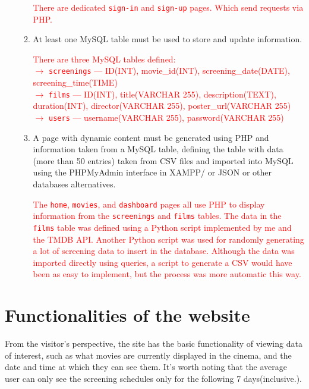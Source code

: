 \documentclass[a4paper]{article}
\begin{document}
\begin{enumerate}
\begin{enumerate}[label={$-$}]
            \textcolor{red}{There are dedicated \texttt{sign-in} and \texttt{sign-up}  pages. Which send requests via PHP.}
            \item At least one MySQL table must be used to store and update information.

            \textcolor{red}{There are three MySQL tables defined:\\$\rightarrow$ \texttt{screenings} --- ID(INT), movie\_id(INT), screening\_date(DATE), screening\_time(TIME)\\$\rightarrow$ \texttt{films} --- ID(INT), title(VARCHAR 255), description(TEXT), duration(INT), director(VARCHAR 255), poster\_url(VARCHAR 255)\\$\rightarrow$ \texttt{users} --- username(VARCHAR 255), password(VARCHAR 255)}
            \item A page with dynamic content must be generated using PHP and information taken from a MySQL table, defining the table with data (more than 50 entries) taken from CSV files and imported into MySQL using the PHPMyAdmin interface in XAMPP/ or JSON or other databases alternatives.

            \textcolor{red}{The \texttt{home}, \texttt{movies}, and \texttt{dashboard} pages all use PHP to display information from the \texttt{screenings} and \texttt{films} tables. The data in the \texttt{films} table was defined using a Python script implemented by me and the TMDB API. Another Python script was used for randomly generating a lot of screening data to insert in the database. Although the data was imported directly using queries, a script to generate a CSV would have been as easy to implement, but the process was more automatic this way.}
            \end{enumerate}
    \end{enumerate}

\section{Functionalities of the website}

From the visitor's perspective, the site has the basic functionality of viewing data of interest, such as what movies are currently displayed in the cinema, and the date and time at which they can see them. It's worth noting that the average user can only see the screening schedules only for the following 7 days(inclusive.).
\end{document}
